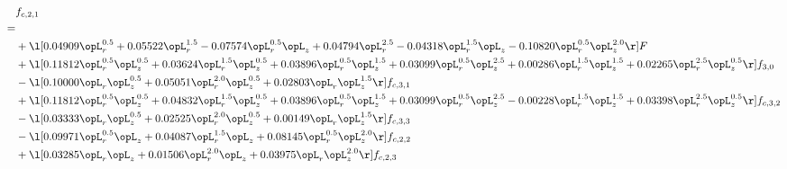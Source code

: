 \begin{alignat}{2} 
\label{eq:f_21_2} 
& f_{c,2,1} \nonumber \\ 
 = \\ 
& + \l[  0.04909 \opL_r^{0.5} +  0.05522 \opL_r^{1.5}   -0.07574 \opL_r^{0.5} \opL_z +  0.04794 \opL_r^{2.5}   -0.04318 \opL_r^{1.5} \opL_z   -0.10820 \opL_r^{0.5} \opL_z^{2.0}  \r] F \nonumber \\ 
& + \l[  0.11812 \opL_r^{0.5} \opL_z^{0.5} +  0.03624 \opL_r^{1.5} \opL_z^{0.5} +  0.03896 \opL_r^{0.5} \opL_z^{1.5} +  0.03099 \opL_r^{0.5} \opL_z^{2.5} +  0.00286 \opL_r^{1.5} \opL_z^{1.5} +  0.02265 \opL_r^{2.5} \opL_z^{0.5}  \r] f_{3,0} \nonumber \\ 
& - \l[  0.10000 \opL_r \opL_z^{0.5} +  0.05051 \opL_r^{2.0} \opL_z^{0.5} +  0.02803 \opL_r \opL_z^{1.5}  \r] f_{c,3,1} \nonumber \\ 
& + \l[  0.11812 \opL_r^{0.5} \opL_z^{0.5} +  0.04832 \opL_r^{1.5} \opL_z^{0.5} +  0.03896 \opL_r^{0.5} \opL_z^{1.5} +  0.03099 \opL_r^{0.5} \opL_z^{2.5}   -0.00228 \opL_r^{1.5} \opL_z^{1.5} +  0.03398 \opL_r^{2.5} \opL_z^{0.5}  \r] f_{c,3,2} \nonumber \\ 
& - \l[  0.03333 \opL_r \opL_z^{0.5} +  0.02525 \opL_r^{2.0} \opL_z^{0.5} +  0.00149 \opL_r \opL_z^{1.5}  \r] f_{c,3,3} \nonumber \\ 
& - \l[  0.09971 \opL_r^{0.5} \opL_z +  0.04087 \opL_r^{1.5} \opL_z +  0.08145 \opL_r^{0.5} \opL_z^{2.0}  \r] f_{c,2,2} \nonumber \\ 
& + \l[  0.03285 \opL_r \opL_z +  0.01506 \opL_r^{2.0} \opL_z +  0.03975 \opL_r \opL_z^{2.0}  \r] f_{c,2,3} \nonumber \\ 
\end{alignat} 



